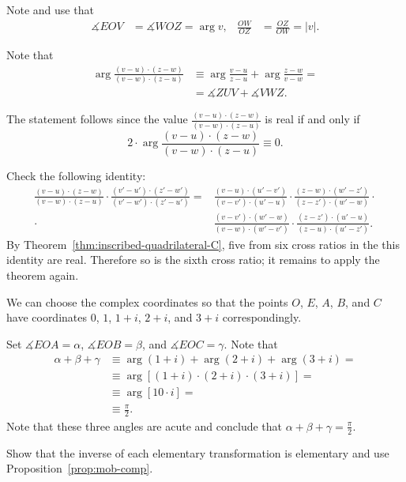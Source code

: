 Note and use that 
\begin{align*}
\measuredangle EOV&=\measuredangle WOZ=\arg v,
&
\frac{OW}{OZ}&=\frac{OZ}{OW}=|v|.
\end{align*}

Note that 
\begin{align*}
\arg\frac{(v-u)\cdot(z-w)}{(v-w)\cdot(z-u)}
&\equiv
\arg\frac{v-u}{z-u}
+
\arg\frac{z-w}{v-w}=
\\
&= \measuredangle ZUV+\measuredangle VWZ.
\end{align*}

The statement follows since the value $\tfrac{(v-u)\cdot(z-w)}{(v-w)\cdot(z-u)}$ is real if and only if 
\[2\cdot\arg\frac{(v-u)\cdot(z-w)}{(v-w)\cdot(z-u)}\equiv0.\]

Check the following identity:
\begin{align*}
\frac{(v-u)\cdot(z-w)}{(v-w)\cdot(z-u)}
\cdot
\frac{(v'-u')\cdot(z'-w')}{(v'-w')\cdot(z'-u')} 
=&
\frac{(v-u)\cdot(u'-v')}{(v-v')\cdot(u'-u)}
\cdot
\frac{(z-w)\cdot(w'-z')}{(z-z')\cdot(w'-w)}
\cdot
\\
\cdot
&
\frac{(v-v')\cdot(w'-w)}{(v-w)\cdot(w'-v')}
\cdot
\frac{(z-z')\cdot(u'-u)}{(z-u)\cdot(u'-z')}.
\end{align*}
By Theorem~\ref{thm:inscribed-quadrilateral-C}, five from six cross ratios in the this identity are real. 
Therefore so is the sixth cross ratio; it remains to apply the theorem again.

We can choose the complex coordinates so that the points $O$, $E$, $A$, $B$, and $C$ have coordinates
$0$, $1$, $1+i$, $2+i$, and $3+i$ correspondingly.

Set $\measuredangle EOA=\alpha$, $\measuredangle EOB=\beta$, and $\measuredangle EOC=\gamma$.
Note that
\begin{align*}
\alpha+\beta+\gamma
&\equiv\arg(1+i)+\arg(2+i)+\arg(3+i)=
\\
&\equiv\arg[(1+i)\cdot(2+i)\cdot(3+i)]=
\\
&\equiv\arg [10\cdot i]=
\\
&\equiv\tfrac\pi2.
\end{align*}
Note that these three angles are acute and conclude that $\alpha+\beta+\gamma=\tfrac\pi2$.

Show that the inverse of each elementary transformation is elementary
and use Proposition~\ref{prop:mob-comp}.

